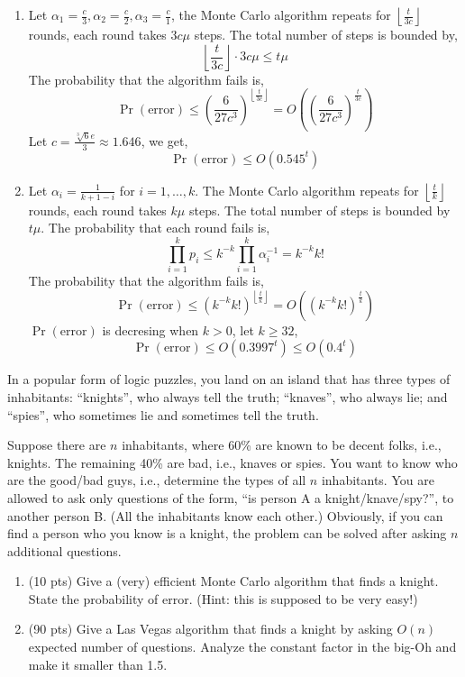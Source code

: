 \documentclass[11pt]{article}
\newcommand{\down}[1]{\left\lfloor #1\right\rfloor}
\begin{document}
\begin{description}
\begin{enumerate}
  \item[(c)] Let $\alpha_1=\frac{c}{3},\alpha_2=\frac{c}{2},\alpha_3=\frac{c}{1}$,
  the Monte Carlo algorithm repeats for $\down{\frac{t}{3c}}$ rounds, each
  round takes $3c\mu$ steps. The total number of steps is bounded by,
  \[\down{\frac{t}{3c}} \cdot 3c\mu \le t\mu\]
  The probability that the algorithm fails is,
  \[\Pr(\text{error}) \le (\frac{6}{27c^3})^{\down{\frac{t}{3c}}} 
  = O((\frac{6}{27c^3})^{\frac{t}{3c}})\]
  Let $c=\frac{\sqrt[3]{6}e}{3}\approx1.646$, we get,
  \[\Pr(\text{error}) \le O(0.545^t)\]

  \item[(d)] Let $\alpha_i=\frac{1}{k+1-i}$ for $i=1,\ldots,k$.
  The Monte Carlo algorithm repeats for $\down{\frac{t}{k}}$ rounds, each
  round takes $k\mu$ steps. The total number of steps is bounded by $t\mu$.
  The probability that each round fails is,
  \[
  \prod_{i=1}^{k}p_i \le k^{-k}\prod_{i=1}^{k}\alpha_i^{-1} 
  = k^{-k}k!
  \]
  The probability that the algorithm fails is,
  \[
  \Pr(\text{error}) \le (k^{-k}k!)^{\down{\frac{t}{k}}} = O((k^{-k}k!)^{\frac{t}{k}})
  \]
  $\Pr(\text{error})$ is decresing when $k>0$, let $k\ge32$,
  \[\Pr(\text{error}) \le O(0.3997^t) \le O(0.4^t)\]
\end{enumerate}



\newpage
\item[Problem 4.2:]
In a popular form of logic puzzles, you 
land on an island that has three types of inhabitants:
``knights'', who always tell the truth;
``knaves'', who always lie; and ``spies'', who sometimes
lie and sometimes tell the truth.  

Suppose there are $n$ inhabitants, where 60\% are known to be decent
folks, i.e., knights.  The remaining 40\% are bad, i.e., knaves or
 spies.  
You want to know who are the good/bad guys, i.e., 
determine the types of all $n$ inhabitants.  You are allowed to ask 
only questions of the form, ``is person A a knight/knave/spy?'', 
to another person B\@.  
(All the inhabitants know each other.)
Obviously, if you can find a person who you
know is a knight, the problem can be solved after asking 
$n$ additional questions.
\begin{enumerate}
\item[(a)] (10 pts) Give a (very) efficient Monte Carlo algorithm that finds a knight.  
State the probability of error.  (Hint: this is supposed to be very easy!)

\smallskip
\item[(b)] (90 pts) Give a Las Vegas algorithm that finds a knight by asking
$O(n)$ expected number of questions.  Analyze the constant factor 
in
the big-Oh and make it smaller than 1.5.


\end{enumerate}
\end{description}
\end{document}

